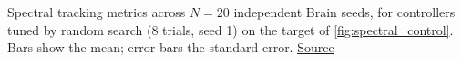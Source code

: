 Spectral tracking metrics across $N = 20$ independent Brain seeds, for controllers tuned by random search (8 trials, seed 1) on the target of \autoref{fig:spectral_control}. Bars show the mean; error bars the standard error. \href{https://github.com/tahmidazam/gg4/blob/main/notebooks/spectral_control_metrics/spectral_control_metrics.ipynb}{\underline{Source}}%